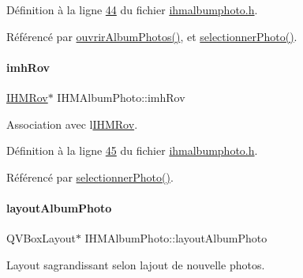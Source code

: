 Définition à la ligne \hyperlink{ihmalbumphoto_8h_source_l00044}{44} du fichier \hyperlink{ihmalbumphoto_8h_source}{ihmalbumphoto.\+h}.



Référencé par \hyperlink{ihmalbumphoto_8cpp_source_l00038}{ouvrir\+Album\+Photos()}, et \hyperlink{ihmalbumphoto_8cpp_source_l00081}{selectionner\+Photo()}.

\mbox{\label{class_i_h_m_album_photo_ab7056087d5ed3ee1528bd7f689b46c2a}} 
\paragraph{\texorpdfstring{imh\+Rov}{imhRov}}
{\footnotesize\ttfamily \hyperlink{class_i_h_m_rov}{I\+H\+M\+Rov}$\ast$ I\+H\+M\+Album\+Photo\+::imh\+Rov\hspace{0.3cm}{\ttfamily [private]}}



Association avec l\textquotesingle{}\hyperlink{class_i_h_m_rov}{I\+H\+M\+Rov}. 



Définition à la ligne \hyperlink{ihmalbumphoto_8h_source_l00045}{45} du fichier \hyperlink{ihmalbumphoto_8h_source}{ihmalbumphoto.\+h}.



Référencé par \hyperlink{ihmalbumphoto_8cpp_source_l00081}{selectionner\+Photo()}.

\mbox{\label{class_i_h_m_album_photo_a1b4028248430efc384e34b0151709fa0}} 
\paragraph{\texorpdfstring{layout\+Album\+Photo}{layoutAlbumPhoto}}
{\footnotesize\ttfamily Q\+V\+Box\+Layout$\ast$ I\+H\+M\+Album\+Photo\+::layout\+Album\+Photo\hspace{0.3cm}{\ttfamily [private]}}



Layout s\textquotesingle{}agrandissant selon l\textquotesingle{}ajout de nouvelle photos. 



